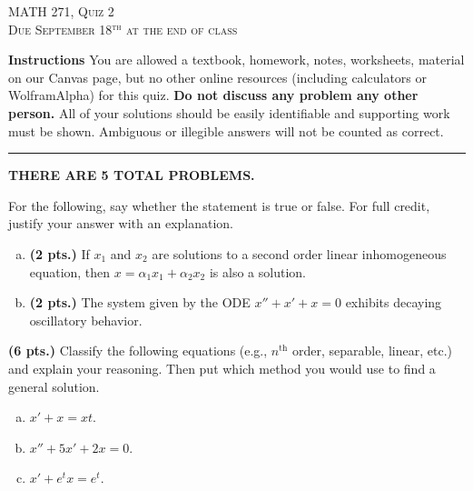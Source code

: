 \documentclass[12pt]{amsbook}
\begin{document}

\begin{center}
   \textsc{\large MATH 271, Quiz 2}\\
   \textsc{Due September 18$^\textrm{th}$ at the end of class}
\end{center}

\vspace{1cm}

\noindent\textbf{Instructions} \; You are allowed a textbook, homework, notes, worksheets, material on our Canvas page, but no other online resources (including calculators or WolframAlpha) for this quiz.  \textbf{Do not discuss any problem any other person.} All of your solutions should be easily identifiable and supporting work must be shown.  Ambiguous or illegible answers will not be counted as correct.


\vspace*{.5cm}
\hrule
\vspace*{.5cm}

\begin{center}\textbf{\large THERE ARE 5 TOTAL PROBLEMS.}\normalsize \end{center}

\begin{problem} For the following, say whether the statement is true or false. For full credit, justify your answer with an explanation.
\begin{enumerate}[(a)]
    \item \textbf{(2 pts.)} If $x_1$ and $x_2$ are solutions to a second order linear inhomogeneous equation, then $x=\alpha_1 x_1 + \alpha_2 x_2$ is also a solution.
    \item \textbf{(2 pts.)} The system given by the ODE $x'' + x' +x=0$ exhibits decaying oscillatory behavior.
\end{enumerate}
\end{problem}

\begin{problem}
\textbf{(6 pts.)} Classify the following equations (e.g., $n^\textrm{th}$ order, separable, linear, etc.) and explain your reasoning. Then put which method you would use to find a general solution.
\begin{enumerate}[(a)]
    \item $x' + x = xt$.
    \item $x'' + 5x'+2x = 0$.
    \item $x'+e^t x = e^t$.
\end{enumerate}
\end{problem}
\end{document}
